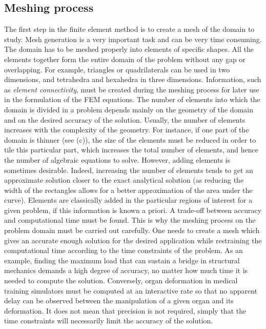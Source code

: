 	\subsection{Meshing process}
The first step in the finite element method is to create a mesh of the domain to study. Mesh generation is a very important task and can be very time consuming. The domain has to be meshed properly into elements of specific shapes. All the elements together form the entire domain of the problem without any gap or overlapping. For example, triangles or quadrilaterals can be used in two dimensions, and tetrahedra and hexahedra in three dimensions. Information, such as \emph{element connectivity}, must be created during the meshing process for later use in the formulation of the FEM equations. The number of elements into which the domain is divided in a problem depends mainly on the geometry of the domain and on the desired accuracy of the solution. Usually, the number of elements increases with the complexity of the geometry. For instance, if one part of the domain is thinner (see  (c)), the size of the elements must be reduced in order to tile this particular part, which increases the total number of elements, and hence the number of algebraic equations to solve. However, adding elements is sometimes desirable. Indeed, increasing the number of elements tends to get an approximate solution closer to the exact analytical solution (as reducing the width of the rectangles allows for a better approximation of the area under the curve). Elements are classically added in the particular regions of interest for a given problem, if this information is known a priori. A trade-off between accuracy and computational time must be found. This is why the meshing process on the problem domain must be carried out carefully. One needs to create a mesh which gives an accurate enough solution for the desired application while restraining the computational time according to the time constraints of the problem. As an example, finding the maximum load that can sustain a bridge in structural mechanics demands a high degree of accuracy, no matter how much time it is needed to compute the solution. Conversely, organ deformation in medical training simulators must be computed at an interactive rate so that no apparent delay can be observed between the manipulation of a given organ and its deformation. It does not mean that precision is not required, simply that the time constraints will necessarily limit the accuracy of the solution. 
	
